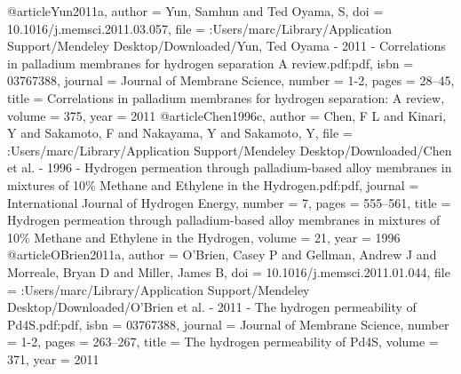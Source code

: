 @article{Yun2011a,
author = {Yun, Samhun and {Ted Oyama}, S},
doi = {10.1016/j.memsci.2011.03.057},
file = {:Users/marc/Library/Application Support/Mendeley Desktop/Downloaded/Yun, Ted Oyama - 2011 - Correlations in palladium membranes for hydrogen separation A review.pdf:pdf},
isbn = {03767388},
journal = {Journal of Membrane Science},
number = {1-2},
pages = {28--45},
title = {{Correlations in palladium membranes for hydrogen separation: A review}},
volume = {375},
year = {2011}
}
@article{Chen1996c,
author = {Chen, F L and Kinari, Y and Sakamoto, F and Nakayama, Y and Sakamoto, Y},
file = {:Users/marc/Library/Application Support/Mendeley Desktop/Downloaded/Chen et al. - 1996 - Hydrogen permeation through palladium-based alloy membranes in mixtures of 10{\%} Methane and Ethylene in the Hydrogen.pdf:pdf},
journal = {International Journal of Hydrogen Energy},
number = {7},
pages = {555--561},
title = {{Hydrogen permeation through palladium-based alloy membranes in mixtures of 10{\%} Methane and Ethylene in the Hydrogen}},
volume = {21},
year = {1996}
}
@article{OBrien2011a,
author = {O'Brien, Casey P and Gellman, Andrew J and Morreale, Bryan D and Miller, James B},
doi = {10.1016/j.memsci.2011.01.044},
file = {:Users/marc/Library/Application Support/Mendeley Desktop/Downloaded/O'Brien et al. - 2011 - The hydrogen permeability of Pd4S.pdf:pdf},
isbn = {03767388},
journal = {Journal of Membrane Science},
number = {1-2},
pages = {263--267},
title = {{The hydrogen permeability of Pd4S}},
volume = {371},
year = {2011}
}
